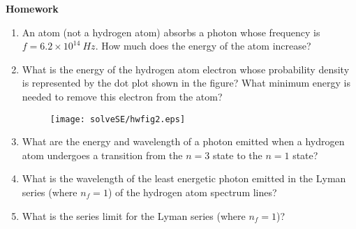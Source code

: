 \textbf{Homework}

\begin{enumerate}

\item An atom (not a hydrogen atom) absorbs a photon whose frequency is
$f = 6.2\times 10^{14}~Hz$.
How much does the energy of the atom increase?

\item What is the energy of the hydrogen atom  electron whose probability density
is represented by the dot plot shown in the figure? 
What minimum energy is needed to remove this electron from the atom?
\begin{figure}[hbt]
\begin{center}
\texttt{[image: solveSE/hwfig2.eps]}
\end{center}
\end{figure}

\item What are the energy and wavelength of a photon emitted when a hydrogen atom
undergoes a transition from the $n=3$ state to the $n=1$ state?

\item What is the wavelength of the least energetic photon emitted in the Lyman
series (where $n_f = 1$) of the hydrogen atom spectrum lines?

\item What is the series limit for the Lyman series (where $n_f = 1$)?

\end{enumerate}
